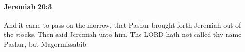 
		\paragraph{Jeremiah 20:3} %
			\label{JEREMIAH-20-3}

			And it came to pass on the morrow, that Pashur brought forth Jeremiah out of the stocks. Then said Jeremiah unto him, The LORD hath not called thy name Pashur, but Magormissabib.


